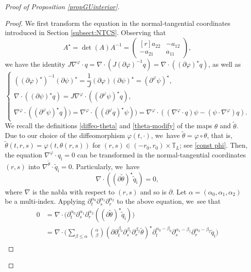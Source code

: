 \documentclass[JEP,XML,SOM,Unicode,NoFloatCountersInSection,published]{cedram}
\newcommand{\dt}{\partial_t}
\theoremstyle{definition}
\begin{document}
\begin{proof}[Proof of Proposition \ref{propGUinterior}]
\begin{proof}
We first transform the equation in the normal-tangential coordinates introduced in Section \ref{subsect:NTCS}.
Observing that
\[
A^\star = \det(A)A^{-1} =
\begin{pmatrix*}[r]
a_{22} & -a_{12} \\
-a_{21} & a_{11}
\end{pmatrix*},
\]
we have the identity $J\nabla^\varphi\cdot q = \nabla\cdot(J(\partial\varphi)^{-1}q) = \nabla\cdot((\partial\varphi)^\star q)$, as well as
\begin{equation}\label{F4}
\begin{cases}
((\partial\varphi)^\star)^{-1}(\partial\psi)^\star = \dfrac{1}{J}(\partial\varphi)(\partial\psi)^\star = (\partial^\varphi\psi)^\star, \\
\nabla\cdot((\partial\psi)^\star q) = J\nabla^\varphi\cdot((\partial^\varphi\psi)^\star q), \\
\nabla^\varphi\cdot((\partial^\varphi\psi)^\star q)) = \nabla^\varphi\cdot((\partial^\varphi q)^\star \psi))
= \nabla^\varphi\cdot((\nabla^\varphi\cdot q)\psi - (\psi\cdot\nabla^\varphi)q).
\end{cases}
\end{equation}
We recall the definitions \eqref{diffeo-theta} and \eqref{theta-modify} of the maps $\theta$ and $\tilde{\theta}$.
Due to our choice of the diffeomorphism $\varphi(t,\cdot)$, we~have $\tilde{\theta}=\varphi\circ\theta$, that is,
$\tilde{\theta}(t,r,s)=\varphi(t,\theta(r,s))$ for $(r,s)\in(-r_0,r_0)\times\mathbb{T}_L$; see \eqref{const phi}.
Then, the equation $\nabla^\varphi\cdot q_\mathrm{i}=0$ can be transformed in the normal-tangential coordinates $(r,s)$ into
$\nabla^{\tilde{\theta}}\cdot\tilde{q}_\mathrm{i}=0$.
Particularly, we~have
\[
\nabla\cdot((\partial\tilde{\theta})^\star\tilde{q}_\mathrm{i}) = 0,
\]
where $\nabla$ is the nabla with respect to $(r,s)$ and so is $\partial$.
Let $\alpha=(\alpha_0,\alpha_1,\alpha_2)$ be a multi-index.
Applying $\dt^{\alpha_0}\partial_s^{\alpha_1}\partial_r^{\alpha_2}$ to the above equation, we~see that
\begin{align*}
0 &= \nabla\cdot\bigl(\dt^{\alpha_0}\partial_s^{\alpha_1}\partial_r^{\alpha_2}((\partial\tilde{\theta})^\star\tilde{q}_\mathrm{i}) \bigr) \\
&= \nabla\cdot\biggl(\sum_{\beta\leq\alpha} \binom{\alpha}{\beta}
(\partial\dt^{\beta_0}\partial_s^{\beta_1}\partial_r^{\beta_2}\tilde{\theta})^\star
\dt^{\alpha_0-\beta_0}\partial_s^{\alpha_1-\beta_1}\partial_r^{\alpha_2-\beta_2}\tilde{q}_\mathrm{i} \biggr) \\

\end{align*}
\end{proof}
\end{proof}
\end{document}
